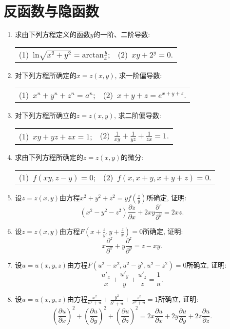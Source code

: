 \section{反函数与隐函数}
\begin{enumerate}
	\item 求由下列方程定义的函数$y$的一阶、二阶导数:
	\begin{table}[H]
		\begin{tabular}{ll}
			(1)\ $\mathrm{ln}\sqrt{x^2+y^2}=\mathrm{arctan}\frac{y}{x}$;\qquad \qquad \qquad \qquad &(2)\ $xy+2^y=0$.
		\end{tabular}
	\end{table}
\item 对下列方程所确定的$x=z(x,y)$, 求一阶偏导数:
\begin{table}[H]
	\begin{tabular}{ll}
		(1)\ $x^n+y^n+z^n = a^n$;\qquad \qquad \qquad \qquad & (2)\ $x+y+z=e^{x+y+z}$.
	\end{tabular}
\end{table}
\item 对下列方程所确立的$z=z(x,y)$, 求二阶偏导数:
\begin{table}[H]
	\begin{tabular}{ll}
		(1)\ $xy+yz+zx = 1$;\qquad \qquad \qquad \qquad & (2)\ $\frac{1}{xy}+\frac{1}{yz}+\frac{1}{zx}=1$.
		\end{tabular}
\end{table}
\item 求由下列方程所确定的$z=z(x,y)$的微分:
\begin{table}[H]
	\begin{tabular}{ll}
		(1)\ $f(xy,z-y)=0$;\qquad \qquad \qquad \qquad &(2)\ $f(x,x+y,x+y+z)=0$.
	\end{tabular}
\end{table}
\item 设$z=z(x,y)$由方程$x^2+y^2+z^2 = yf(\frac{z}{y})$所确定, 证明:
$$(x^2-y^2-z^2)\frac{\partial z}{\partial x} +2xy\frac{\partial^z}{\partial^y}=2xz.$$
\item 设$z=z(x,y)$由方程$F(x+\frac{z}{y},y+\frac{z}{x})=0$所确定, 证明:
$$ x\frac{\partial^z}{\partial^x} + y\frac{\partial^z}{\partial^y} = z -xy.$$
\item 设$u=u(x,y,z)$由方程$F(u^2-x^2,u^2-y^2,u^2-z^2)=0$所确立, 证明:
$$ \frac{u'_x}{x}+\frac{u'_y}{y} + \frac{u'_z}{z} = \frac{1}{u}.$$
\item 设$u=u(x,y,z)$由方程$\frac{x^2}{a^2+u}+\frac{y^2}{b^2+u}+\frac{z^2}{c^2+u}=1$所确立, 证明:
$$ (\frac{\partial u}{\partial x})^2 + (\frac{\partial u}{\partial y})^2+(\frac{\partial u}{\partial z})^2 = 2x\frac{\partial u}{\partial x}+2y\frac{\partial u}{\partial y} +2z\frac{\partial u}{\partial z}.$$

\end{enumerate}
